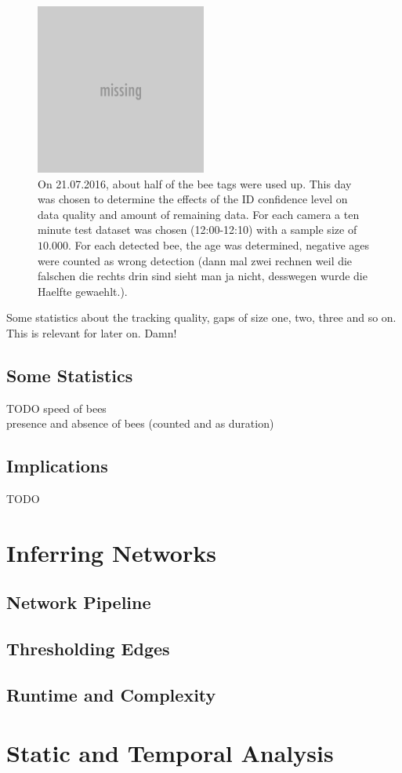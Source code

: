 \begin{figure}[htb]
	\centering
	\includegraphics[width=0.5\textwidth]{Figures/foo}
	\caption[Tradeoff: Confidence level, data quality and amount of data]{On 21.07.2016, about half of the bee tags were used up. This day was chosen to determine the effects of the ID confidence level on data quality and amount of remaining data. For each camera a ten minute test dataset was chosen (12:00-12:10) with a sample size of $10.000$. For each detected bee, the age was determined, negative ages were counted as wrong detection (dann mal zwei rechnen weil die falschen die rechts drin sind sieht man ja nicht, desswegen wurde die Haelfte gewaehlt.).}
	\label{fig:tradeoff}
\end{figure}

Some statistics about the tracking quality, gaps of size one, two, three and so on. This is relevant for later on. Damn!

\subsection{Some Statistics}
TODO
speed of bees\\
presence and absence of bees (counted and as duration)\\

\subsection{Implications}
TODO


\section{Inferring Networks}

\subsection{Network Pipeline}
\subsection{Thresholding Edges}
\subsection{Runtime and Complexity}

\section{Static and Temporal Analysis}	






